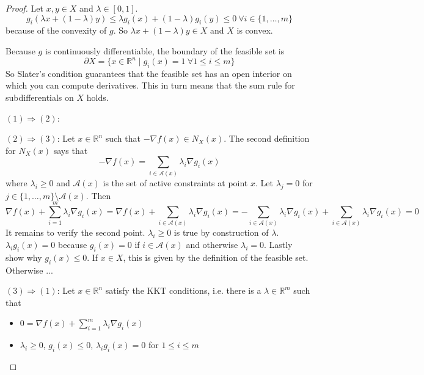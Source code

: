 \documentclass[10pt,a4paper]{article}
\begin{document}
\begin{proof}
  Let $x, y \in X$ and $\lambda \in [0, 1]$.
  \begin{equation*}
    g_{i}(\lambda x + (1 - \lambda)y) \le \lambda g_{i}(x) + (1 - \lambda)g_{i}(y) \le 0~\forall i \in \{ 1, \dots, m \}
  \end{equation*}
  because of the convexity of $g$.
  So $\lambda x + (1 - \lambda)y \in X$ and $X$ is convex.

  Because $g$ is continuously differentiable, the boundary of the feasible set is
  \begin{equation*}
    \partial X = \{ x \in \mathbb{R}^{n} \mid g_{i}(x) = 1~\forall 1 \le i \le m \}
  \end{equation*}
  So Slater's condition guarantees that the feasible set has an open interior on which you can compute derivatives.
  This in turn means that the sum rule for subdifferentials on $X$ holds.

  $(1) \Rightarrow (2)$:

  $(2) \Rightarrow (3)$: Let $x \in \mathbb{R}^{n}$ such that $-\nabla f(x) \in N_{X}(x)$.
  The second definition for $N_{X}(x)$ says that
  \begin{equation*}
    -\nabla f(x) = \sum_{i \in \mathcal{A}(x)} \lambda_{i} \nabla g_{i}(x)
  \end{equation*}
  where $\lambda_{i} \ge 0$ and $\mathcal{A}(x)$ is the set of active constraints at point $x$.
  Let $\lambda_{j} = 0$ for $j \in \{ 1, \dots, m \} \setminus \mathcal{A}(x)$.
  Then
  \begin{equation*}
    \nabla f(x) + \sum_{i = 1}^{m} \lambda_{i} \nabla g_{i}(x) = \nabla f(x) + \sum_{i \in \mathcal{A}(x)} \lambda_{i} \nabla g_{i}(x) = -\sum_{i \in \mathcal{A}(x)} \lambda_{i} \nabla g_{i}(x) + \sum_{i \in \mathcal{A}(x)} \lambda_{i} \nabla g_{i}(x) = 0
  \end{equation*}
  It remains to verify the second point.
  $\lambda_{i} \ge 0$ is true by construction of $\lambda$.
  $\lambda_{i} g_{i}(x) = 0$ because $g_{i}(x) = 0$ if $i \in \mathcal{A}(x)$ and otherwise $\lambda_{i} = 0$.
  Lastly show why $g_{i}(x) \le 0$.
  If $x \in X$, this is given by the definition of the feasible set.
  Otherwise ...

  $(3) \Rightarrow (1)$: Let $x \in \mathbb{R}^{n}$ satisfy the KKT conditions, i.e. there is a $\lambda \in \mathbb{R}^{m}$ such that
  \begin{itemize}
  \item $0 = \nabla f(x) + \sum_{i = 1}^{m} \lambda_{i} \nabla g_{i}(x)$
  \item $\lambda_{i} \ge 0$, $g_{i}(x) \le 0$, $\lambda_{i} g_{i}(x) = 0$ for $1 \le i \le m$
  \end{itemize}
\end{proof}
\end{document}
